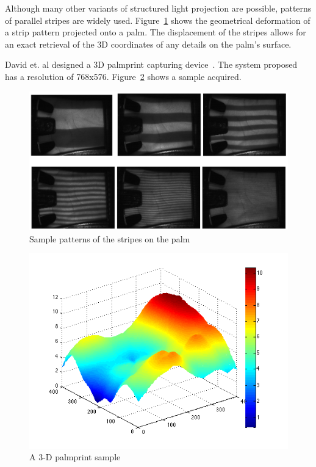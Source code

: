 Although many other variants of structured light projection are possible, patterns of parallel stripes are widely used. Figure~\ref{fig:pastwork:strippattern} shows the geometrical deformation of a strip pattern projected onto a palm. The displacement of the stripes allows for an exact retrieval of the 3D coordinates of any details on the palm's surface.

David et. al designed a 3D palmprint capturing device~\cite{Zhang:2008kc}. The system proposed has a resolution of 768x576. Figure~\ref{fig:pastwork:sample} shows a sample acquired.

\begin{figure}[htb]
  \begin{center}
    \includegraphics[width=0.9\linewidth]{ch-pastwork/figures/strippattern}
    \caption[Sample patterns of the stripes on the palm]{Sample patterns of the stripes on the palm~\cite{Li:2009eq}}
    \label{fig:pastwork:strippattern}
  \end{center}
\end{figure}

\begin{figure}[htb]
  \begin{center}
    \includegraphics[width=0.9\linewidth]{ch-pastwork/figures/sample}
    \caption[A 3-D palmprint sample]{A 3-D palmprint sample}
    \label{fig:pastwork:sample}
  \end{center}
\end{figure}
